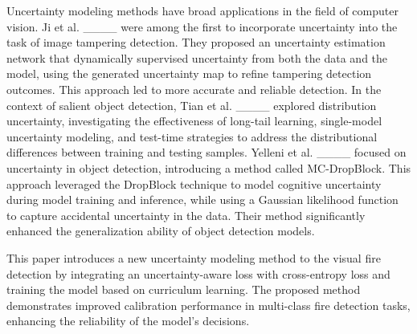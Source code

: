 Uncertainty modeling methods have broad applications in the field of computer vision. Ji et al. ____ were among the first to incorporate uncertainty into the task of image tampering detection. They proposed an uncertainty estimation network that dynamically supervised uncertainty from both the data and the model, using the generated uncertainty map to refine tampering detection outcomes. This approach led to more accurate and reliable detection. In the context of salient object detection, Tian et al. ____ explored distribution uncertainty, investigating the effectiveness of long-tail learning, single-model uncertainty modeling, and test-time strategies to address the distributional differences between training and testing samples. Yelleni et al. ____ focused on uncertainty in object detection, introducing a method called MC-DropBlock. This approach leveraged the DropBlock technique to model cognitive uncertainty during model training and inference, while using a Gaussian likelihood function to capture accidental uncertainty in the data. Their method significantly enhanced the generalization ability of object detection models.

This paper introduces a new uncertainty modeling method to the visual fire detection by integrating an uncertainty-aware loss with cross-entropy loss and training the model based on curriculum learning. The proposed method demonstrates improved calibration performance in multi-class fire detection tasks, enhancing the reliability of the model's decisions.